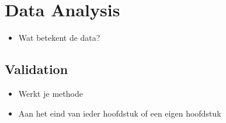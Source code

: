 \documentclass{ou-report}
\newcommand{\outline}[1]{{\color{blue} #1}}
\begin{document}

\chapter{Data Analysis}
\outline{
\begin{itemize}
    \item Wat betekent de data?
\end{itemize}
}

\section{Validation}
\outline{
\begin{itemize}
    \item Werkt je methode
    \item Aan het eind van ieder hoofdstuk of een eigen hoofdstuk
\end{itemize}
}

\end{document}
